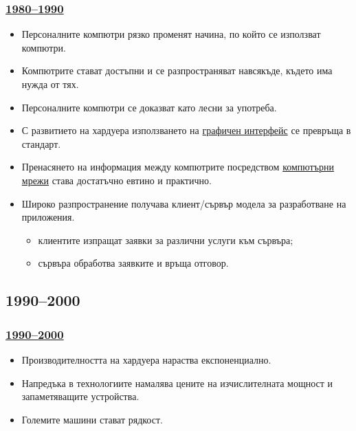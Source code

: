 \documentclass[ignorenonframetext, hyperref=unicode]{beamer}
\begin{document}
\begin{frame}
\frametitle{\href{http://en.wikipedia.org/wiki/History_of_computing_hardware_(1960s-present)}{
1980--1990}}
\begin{itemize}
   \item Персоналните компютри рязко променят начина, по който се използват компютри.
   \item Компютрите стават достъпни и се разпространяват навсякъде, където има
   нужда от тях.
   \item Персоналните компютри се доказват като лесни за употреба.
   \item С развитието на хардуера използването на
   \href{http://en.wikipedia.org/wiki/History_of_the_graphical_user_interface}{графичен интерфейс} се превръща 
    в стандарт.
   \item Пренасянето на информация между компютрите посредством
   \href{http://en.wikipedia.org/wiki/Computer_networking}{компютърни мрежи} 
   става достатъчно евтино и практично.
   \item Широко разпространение получава клиент/сървър модела за разработване на
    приложения.
   \begin{itemize}
     \item клиентите изпращат заявки за различни услуги към сървъра;
     \item сървъра обработва заявките и връща отговор.
   \end{itemize}
\end{itemize}
\end{frame}
  

\subsection{1990--2000}

\begin{frame}
\frametitle{\href{http://en.wikipedia.org/wiki/History_of_computing_hardware_(1960s-present)}{
1990--2000}}
\begin{itemize}
  \item Производителността на хардуера нараства експоненциално.
  \item Напредъка в технологиите намалява цените на изчислителната мощност и
  запаметяващите устройства.
  \item Големите машини стават рядкост.
\end{itemize}
\end{frame}
\end{document}
